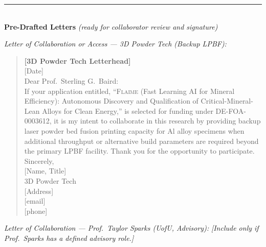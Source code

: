 \documentclass[11pt,letterpaper]{article}
\newcommand{\flaime}{\textsc{Flaime}}
\newcommand{\projecttitle}{\flaime{} (Fast Learning AI for Mineral
Efficiency): Autonomous Discovery and Qualification of
Critical-Mineral-Lean Alloys for Clean Energy}
\begin{document}
\bigskip
\noindent\rule{\textwidth}{0.4pt}\\
\textbf{\large Pre-Drafted Letters} \textit{(ready for collaborator review and signature)}









\clearpage
\textit{Letter of Collaboration or Access --- 3D Powder Tech (Backup LPBF):}

\begin{quote}\small
\textbf{{[}3D Powder Tech Letterhead{]}}\\[4pt]
{[}Date{]}\\[6pt]
Dear Prof.\ Sterling G.\ Baird:\\[4pt]
If your application entitled, ``\projecttitle{},'' is selected for
funding under DE-FOA-0003612, it is my intent to collaborate in this
research by providing backup laser powder bed fusion printing capacity for
Al alloy specimens when additional throughput or alternative build
parameters are required beyond the primary LPBF facility.
Thank you for the opportunity to participate.\\[12pt]
Sincerely,\\[4pt]
{[}Name, Title{]}\\
3D Powder Tech\\
{[}Address{]}\\
{[}email{]}\\
{[}phone{]}
\end{quote}



\clearpage
\textit{Letter of Collaboration --- Prof.\ Taylor Sparks (UofU, Advisory):}
\textit{{[}Include only if Prof.\ Sparks has a defined advisory role.{]}}
\end{document}
